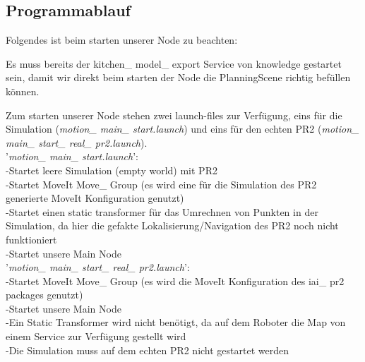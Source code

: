 \documentclass{suturo}
\begin{document}
\subsection{Programmablauf}

Folgendes ist beim starten unserer Node zu beachten:

Es muss bereits der kitchen\_ model\_ export Service von knowledge gestartet sein, damit wir direkt beim starten der Node die PlanningScene richtig befüllen können.

Zum starten unserer Node stehen zwei launch-files zur Verfügung, eins für die Simulation (\textit{motion\_ main\_ start.launch}) und eins für den echten PR2 (\textit{motion\_ main\_ start\_ real\_ pr2.launch}).
\\

'\textit{motion\_ main\_ start.launch}': \\
-Startet leere Simulation (empty world) mit PR2 \\
-Startet MoveIt Move\_ Group (es wird eine für die Simulation des PR2 generierte MoveIt Konfiguration genutzt)\\
-Startet einen static transformer für das Umrechnen von Punkten in der Simulation, da hier die gefakte Lokalisierung/Navigation des PR2 noch nicht funktioniert \\
-Startet unsere Main Node \\

'\textit{motion\_ main\_ start\_ real\_ pr2.launch}': \\
-Startet MoveIt Move\_ Group (es wird die MoveIt Konfiguration des iai\_ pr2 packages genutzt) \\
-Startet unsere Main Node \\
-Ein Static Transformer wird nicht benötigt, da auf dem Roboter die Map von einem Service zur Verfügung gestellt wird \\
-Die Simulation muss auf dem echten PR2 nicht gestartet werden \\
\end{document}
